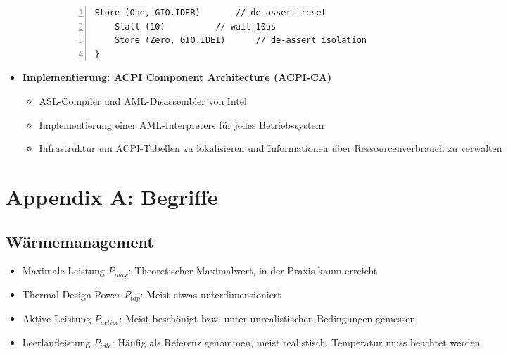 \begin{itemize}
\begin{itemize}
\begin{itemize}
\begin{minipage}{\textwidth}
\begin{lstlisting}[frame=single,numbers=left,mathescape]
	Store (One, GIO.IDER)		// de-assert reset
	Stall (10)			// wait 10us
	Store (Zero, GIO.IDEI)		// de-assert isolation
}
				\end{lstlisting}
				\end{minipage}
		\end{itemize}
	\end{itemize}
	\item \textbf{Implementierung: ACPI Component Architecture (ACPI-CA)}
	\begin{itemize}
		\item ASL-Compiler und AML-Disassembler von Intel
		\item Implementierung einer AML-Interpreters für jedes Betriebssystem
		\item Infrastruktur um ACPI-Tabellen zu lokalisieren und Informationen über Ressourcenverbrauch zu verwalten
	\end{itemize}
\end{itemize}



\section{Appendix A: Begriffe}

\subsection{Wärmemanagement}
\begin{itemize}
	\item Maximale Leistung \(P_{max}\): Theoretischer Maximalwert, in der Praxis kaum erreicht
	\item Thermal Design Power \(P_{tdp}\): Meist etwas unterdimensioniert
	\item Aktive Leistung \(P_{active}\): Meist beschönigt bzw. unter unrealistischen Bedingungen gemessen
	\item Leerlaufleistung \(P_{idle}\): Häufig als Referenz genommen, meist realistisch. Temperatur muss beachtet werden
\end{itemize}


